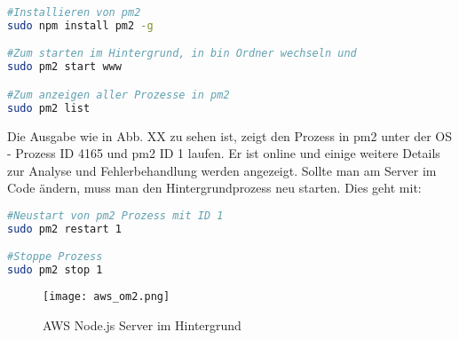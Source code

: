 \begin{lstlisting}[language=bash]
#Installieren von pm2
sudo npm install pm2 -g

#Zum starten im Hintergrund, in bin Ordner wechseln und
sudo pm2 start www

#Zum anzeigen aller Prozesse in pm2
sudo pm2 list
\end{lstlisting}

Die Ausgabe wie in Abb. XX zu sehen ist, zeigt den Prozess in pm2 unter der OS - Prozess ID 4165 und pm2 ID 1 laufen. Er ist online und einige weitere Details zur Analyse und Fehlerbehandlung werden angezeigt. Sollte man am Server im Code ändern, muss man den Hintergrundprozess neu starten. Dies geht mit:

\begin{lstlisting}[language=bash]
#Neustart von pm2 Prozess mit ID 1
sudo pm2 restart 1

#Stoppe Prozess
sudo pm2 stop 1
\end{lstlisting}

\begin{center}
\begin{figure}[h]
    \centering
    \texttt{[image: aws\_om2.png]}
    \caption{AWS Node.js Server im Hintergrund}
\end{figure}
\end{center}


\newpage
 